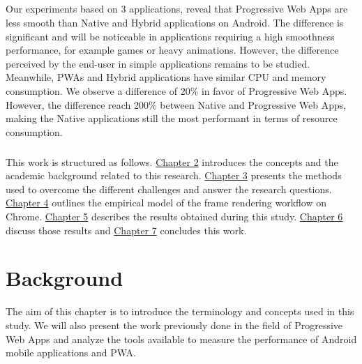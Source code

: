 \documentclass{kththesis}
\begin{document}
\paragraph{}
Our experiments based on 3 applications, reveal that Progressive Web Apps are less smooth than Native and Hybrid applications on Android. The difference is significant and will be noticeable in applications requiring a high smoothness performance, for example games or heavy animations. However, the difference perceived by the end-user in simple applications remains to be studied. Meanwhile, PWAs and Hybrid applications have similar CPU and memory consumption. We observe a difference of 20\% in favor of Progressive Web Apps. However, the difference reach 200\% between Native and Progressive Web Apps, making the Native applications still the most performant in terms of resource consumption. 

\paragraph{}
This work is structured as follows. \hyperref[ch:background]{Chapter 2} introduces the concepts and the academic background related to this research. \hyperref[ch:methodology]{Chapter 3} presents the methods used to overcome the different challenges and answer the research questions. \hyperref[ch:model]{Chapter 4} outlines the empirical model of the frame rendering workflow on Chrome. \hyperref[ch:results]{Chapter 5} describes the results obtained during this study. \hyperref[ch:discussion]{Chapter 6} discuss those results and \hyperref[ch:conclusion]{Chapter 7} concludes this work. 


\chapter{Background}
\label{ch:background}

The aim of this chapter is to introduce the terminology and concepts used in this study. We will also present the work previously done in the field of Progressive Web Apps and analyze the tools available to measure the performance of Android mobile applications and PWA.
\end{document}
